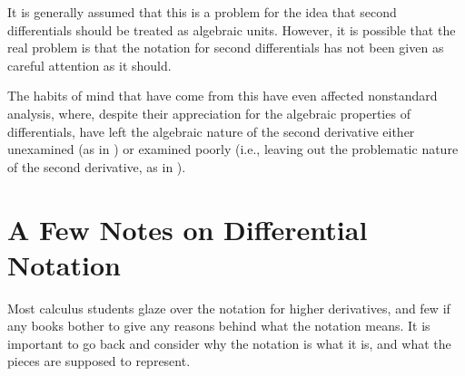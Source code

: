 It is generally assumed that this is a problem for the idea that second differentials should be treated as algebraic units.
However, it is possible that the real problem is that the notation for second differentials has not been given as careful attention as it should.

The habits of mind that have come from this have even affected nonstandard analysis, where, despite their appreciation for the algebraic properties of differentials, have left the algebraic nature of the second derivative either unexamined (as in \citep{henle1979})  or examined poorly (i.e., leaving out the problematic nature of the second derivative, as in  \citep[pg.~4]{keisler2000}).

\section{A Few Notes on Differential Notation}
\label{secdiffnotation}

Most calculus students glaze over the notation for higher derivatives, and few if any books bother to give any reasons behind what the notation means.
It is important to go back and consider why the notation is what it is, and what the pieces are supposed to represent.

